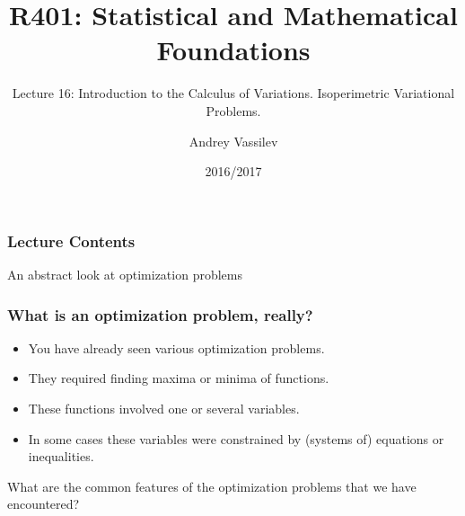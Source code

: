\documentclass[10pt]{beamer}
\title{R401: Statistical and Mathematical Foundations}
\subtitle{Lecture 16: Introduction to the Calculus of Variations. Isoperimetric Variational Problems.}
\author{Andrey Vassilev}
\date{2016/2017}
\theoremstyle{definition}
\begin{document}
\maketitle



\begin{frame}[fragile]
\frametitle{Lecture Contents}
\tableofcontents
\end{frame}

\begin{section}{An abstract look at optimization problems}\label{sec:abstr}
\begin{frame}[fragile]
\frametitle{What is an optimization problem, really?}
\begin{itemize} \itemsep1em
\item You have already seen various optimization problems.
\item They required finding maxima or minima of functions.
\item These functions involved one or several variables.
\item In some cases these variables were constrained by (systems of) equations or inequalities.
\end{itemize}\bigskip \pause

\alert{What are the common features of the optimization problems that we have encountered?}
\end{frame}


\end{section}
\end{document}
